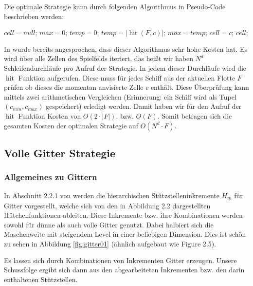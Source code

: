 \documentclass[a4paper,12pt]{llncs}
\numberwithin{equation}{section}
\DeclareMathOperator{\hit}{hit}
\begin{document}
Die optimale Strategie kann durch folgenden Algorithmus in Pseudo-Code beschrieben werden:

\begin{tcolorbox}
	\begin{algorithmic}
		\State $cell = null$;
		\State $max = 0$;
		\State $temp = 0$;
		\State $temp=\left|\hit(F,c)\right|$;
		\State $max=temp$;
		\State $cell = c$;
		\EndIf
		\EndFor
		\State \Return $cell$;
		\EndFunction
	\end{algorithmic}
\end{tcolorbox}

In \cite{M13} wurde bereits angesprochen, dass dieser Algorithmus sehr hohe Kosten hat. Es wird über alle Zellen des Spielfelds iteriert, das heißt wir haben $N^d$ Schleifendurchläufe pro Aufruf der Strategie. In jedem dieser Durchläufe wird die $\hit$ Funktion aufgerufen. Diese muss für jedes Schiff aus der aktuellen Flotte $F$ prüfen ob dieses die momentan anvisierte Zelle $c$ enthält. Diese Überprüfung kann mittels zwei arithmetischen Vergleichen (Erinnerung: ein Schiff wird als Tupel $(c_{min},c_{max})$ gespeichert) erledigt werden. Damit haben wir für den Aufruf der $\hit$ Funktion Kosten von $O(2\cdot |F|)$, bzw. $O(F)$. Somit betragen sich die gesamten Kosten der optimalen Strategie auf $O(N^d\cdot F)$. 

\subsection{Volle Gitter Strategie}

\subsubsection{Allgemeines zu Gittern}

In Abschnitt 2.2.1 von \cite{M13} werden die hierarchischen Stützstelleninkremente $H_{\underline{m}}$ für Gitter vorgestellt, welche sich von den in \cite{M13} Abbildung 2.2 dargestellten Hütchenfunktionen ableiten. Diese Inkremente bzw. ihre Kombinationen werden sowohl für dünne als auch volle Gitter genutzt. Dabei halbiert sich die Maschenweite mit steigendem Level in einer beliebigen Dimension. Dies ist schön zu sehen in Abbildung \ref{fig:gitter01} (ähnlich aufgebaut wie \cite{P10} Figure 2.5).

Es lassen sich durch Kombinationen von Inkrementen Gitter erzeugen. Unsere Schussfolge ergibt sich dann aus den abgearbeiteten Inkrementen bzw. den darin enthaltenen Stützstellen. 
\end{document}
